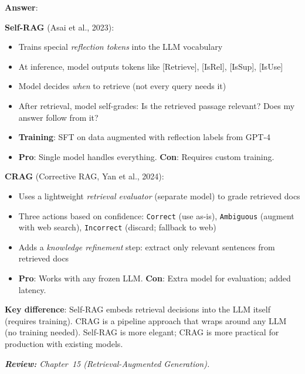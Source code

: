 \begin{questionbox}
\textbf{Answer}:

\textbf{Self-RAG} (Asai et al., 2023):

\begin{itemize}
  \item Trains special \emph{reflection tokens} into the LLM vocabulary
  \item At inference, model outputs tokens like [Retrieve], [IsRel], [IsSup], [IsUse]
  \item Model decides \emph{when} to retrieve (not every query needs it)
  \item After retrieval, model self-grades: Is the retrieved passage relevant? Does my answer follow from it?
  \item \textbf{Training}: SFT on data augmented with reflection labels from GPT-4
  \item \textbf{Pro}: Single model handles everything. \textbf{Con}: Requires custom training.
\end{itemize}

\textbf{CRAG} (Corrective RAG, Yan et al., 2024):

\begin{itemize}
  \item Uses a lightweight \emph{retrieval evaluator} (separate model) to grade retrieved docs
  \item Three actions based on confidence: \texttt{Correct} (use as-is), \texttt{Ambiguous} (augment with web search), \texttt{Incorrect} (discard; fallback to web)
  \item Adds a \emph{knowledge refinement} step: extract only relevant sentences from retrieved docs
  \item \textbf{Pro}: Works with any frozen LLM. \textbf{Con}: Extra model for evaluation; added latency.
\end{itemize}

\textbf{Key difference}: Self-RAG embeds retrieval decisions into the LLM itself (requires training). CRAG is a pipeline approach that wraps around any LLM (no training needed). Self-RAG is more elegant; CRAG is more practical for production with existing models.

\emph{\textbf{Review:} Chapter~15 (Retrieval-Augmented Generation).}
\end{questionbox}

